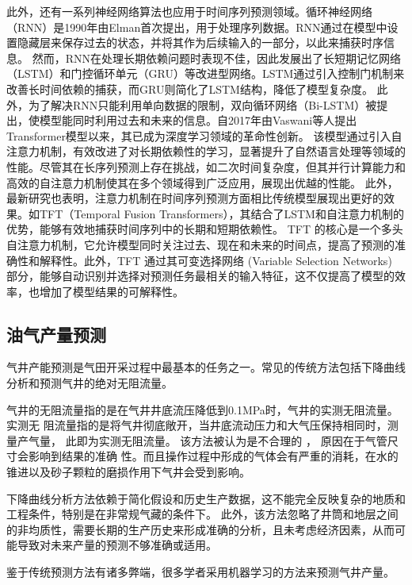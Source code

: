 此外，还有一系列神经网络算法也应用于时间序列预测领域。循环神经网络\cite{li2018independently}（RNN）是1990年由Elman首次提出，用于处理序列数据。RNN通过在模型中设置隐藏层来保存过去的状态，并将其作为后续输入的一部分，以此来捕获时序信息。
然而，RNN在处理长期依赖问题时表现不佳，因此发展出了长短期记忆网络\cite{yu2019review}（LSTM）和门控循环单元\cite{dey2017gate}（GRU）等改进型网络。LSTM通过引入控制门机制来改善长时间依赖的捕获，而GRU则简化了LSTM结构，降低了模型复杂度。
此外，为了解决RNN只能利用单向数据的限制，双向循环网络\cite{graves2005framewise}（Bi-LSTM）被提出，使模型能同时利用过去和未来的信息。自2017年由Vaswani等人提出Transformer模型\cite{vaswani2017attention}以来，其已成为深度学习领域的革命性创新。
该模型通过引入自注意力机制，有效改进了对长期依赖性的学习，显著提升了自然语言处理等领域的性能。尽管其在长序列预测上存在挑战，如二次时间复杂度，但其并行计算能力和高效的自注意力机制使其在多个领域得到广泛应用，展现出优越的性能。
此外，最新研究也表明，注意力机制在时间序列预测方面相比传统模型展现出更好的效果。如TFT\cite{lim2021temporal}（Temporal Fusion Transformers），其结合了LSTM和自注意力机制的优势，能够有效地捕获时间序列中的长期和短期依赖性。
TFT 的核心是一个多头自注意力机制，它允许模型同时关注过去、现在和未来的时间点，提高了预测的准确性和解释性。此外，TFT 通过其可变选择网络 (Variable Selection Networks) 部分，能够自动识别并选择对预测任务最相关的输入特征，这不仅提高了模型的效率，也增加了模型结果的可解释性。
\subsection{油气产量预测}
气井产能预测是气田开采过程中最基本的任务之一。常见的传统方法包括下降曲线分析\cite{arps1945analysis}和预测气井的绝对无阻流量\cite{rawlins1935back}。

气井的无阻流量指的是在气井井底流压降低到0.1MPa时，气井的实测无阻流量。实测无
阻流量指的是将气井彻底敞开，当井底流动压力和大气压保持相同时，测量产气量， 此即为实测无阻流量。 该方法被认为是不合理的 ， 原因在于气管尺寸会影响到结果的准确
性。而且操作过程中形成的气体会有严重的消耗，在水的锥进以及砂子颗粒的磨损作用下气井会受到影响。

下降曲线分析方法依赖于简化假设和历史生产数据，这不能完全反映复杂的地质和工程条件，特别是在非常规气藏的条件下。
此外，该方法忽略了井筒和地层之间的非均质性，需要长期的生产历史来形成准确的分析，且未考虑经济因素，从而可能导致对未来产量的预测不够准确或适用。

鉴于传统预测方法有诸多弊端，很多学者采用机器学习的方法来预测气井产量。

